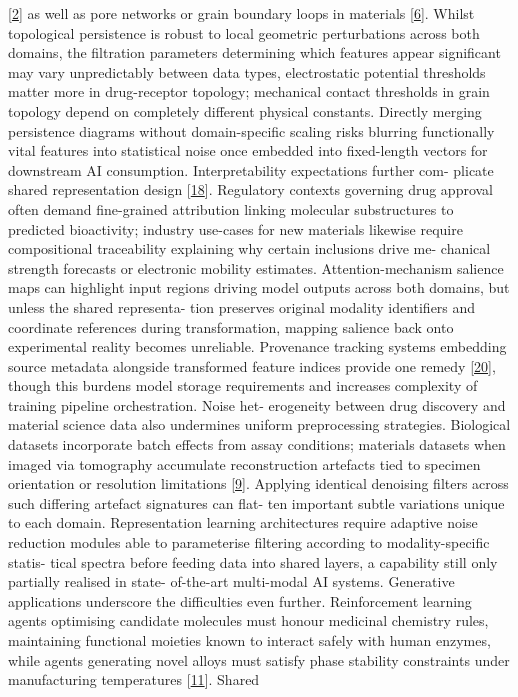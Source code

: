 \documentclass[
]{article}
\begin{document}
{[}\hyperref[_bookmark42]{2}{]} as well as pore networks or grain
boundary loops in materials {[}\hyperref[_bookmark46]{6}{]}. Whilst
topological persistence is robust to local geometric perturbations
across both domains, the filtration parameters determining which
features appear significant may vary unpredictably between data types,
electrostatic potential thresholds matter more in drug-receptor
topology; mechanical contact thresholds in grain topology depend on
completely different physical constants. Directly merging persistence
diagrams without domain-specific scaling risks blurring functionally
vital features into statistical noise once embedded into fixed-length
vectors for downstream AI consumption. Interpretability expectations
further com- plicate shared representation design
{[}\hyperref[_bookmark58]{18}{]}. Regulatory contexts governing drug
approval often demand fine-grained attribution linking molecular
substructures to predicted bioactivity; industry use-cases for new
materials likewise require compositional traceability explaining why
certain inclusions drive me- chanical strength forecasts or electronic
mobility estimates. Attention-mechanism salience maps can highlight
input regions driving model outputs across both domains, but unless the
shared representa- tion preserves original modality identifiers and
coordinate references during transformation, mapping salience back onto
experimental reality becomes unreliable. Provenance tracking systems
embedding source metadata alongside transformed feature indices provide
one remedy {[}\hyperref[_bookmark60]{20}{]}, though this burdens model
storage requirements and increases complexity of training pipeline
orchestration. Noise het- erogeneity between drug discovery and material
science data also undermines uniform preprocessing strategies.
Biological datasets incorporate batch effects from assay conditions;
materials datasets when imaged via tomography accumulate reconstruction
artefacts tied to specimen orientation or resolution limitations
{[}\hyperref[_bookmark49]{9}{]}. Applying identical denoising filters
across such differing artefact signatures can flat- ten important subtle
variations unique to each domain. Representation learning architectures
require adaptive noise reduction modules able to parameterise filtering
according to modality-specific statis- tical spectra before feeding data
into shared layers, a capability still only partially realised in state-
of-the-art multi-modal AI systems. Generative applications underscore
the difficulties even further. Reinforcement learning agents optimising
candidate molecules must honour medicinal chemistry rules, maintaining
functional moieties known to interact safely with human enzymes, while
agents generating novel alloys must satisfy phase stability constraints
under manufacturing temperatures {[}\hyperref[_bookmark51]{11}{]}.
Shared
\end{document}
